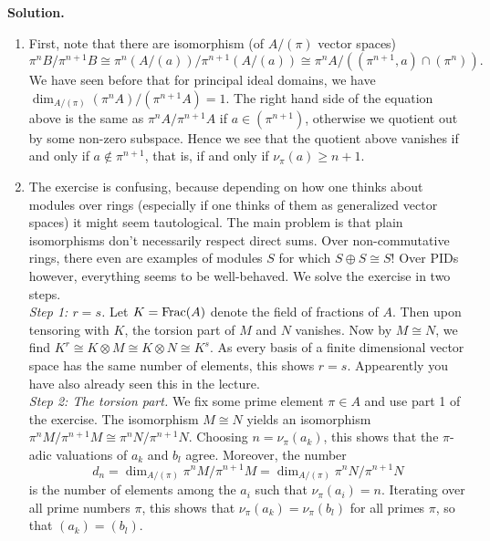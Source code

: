 \documentclass[a4paper,11pt]{article}
\begin{document}
\textbf{Solution.}
\begin{enumerate}
    \item First, note that there are isomorphism (of $A/(\pi)$ vector spaces)
        \begin{equation*}
            \pi^n B/\pi^{n+1}B \cong \pi^n \left(A / (a)\right) /
            \pi^{n+1}\left(A / (a)\right) \cong \pi^n A / ((\pi^{n+1}, a) \cap
            (\pi^n)).
        \end{equation*}
        We have seen before that for principal ideal domains, we have 
        $\dim_{A/(\pi)} (\pi^n A)/(\pi^{n+1}A) = 1$. The right hand side
        of the equation above is the same as $\pi^n A/\pi^{n+1}A$ if 
        $a \in (\pi^{n+1})$, otherwise we quotient out by some
        non-zero subspace. Hence we see that 
        the quotient above vanishes if and only if $a \not \in \pi^{n+1}$, that is,
        if and only if $\nu_\pi(a) \geq n+1$. 
    \item The exercise is confusing, because depending on how one thinks about 
        modules over rings (especially if one thinks of them as generalized
        vector spaces) it might seem tautological. The main problem is that
        plain isomorphisms don't necessarily respect direct sums. Over
        non-commutative rings, there even are examples of modules $S$ for which 
        $S\oplus S \cong S$! Over PIDs however, everything seems to be
        well-behaved. We solve the exercise in two steps.\\
        \textit{Step 1: $r=s$.} Let $K = \mathrm{Frac}(A)$ denote the field of
        fractions of $A$. Then
        upon tensoring with $K$, the torsion part of $M$ and $N$ vanishes.
        Now by $M \cong N$, we find $K^r \cong K \otimes M \cong K \otimes N \cong
        K^s$. As every basis of a finite dimensional vector space has the same
        number of elements, this shows $r = s$. Appearently you have also already
        seen this in the lecture. \\
        \textit{Step 2: The torsion part.} We fix some prime element $\pi \in A$ and 
        use part 1 of the exercise. The isomorphism $M \cong N$ yields an
        isomorphism $\pi^n M/\pi^{n+1}M \cong \pi^n N/\pi^{n+1}N$. 
        Choosing $n = \nu_\pi(a_k)$, this shows that the $\pi$-adic valuations
        of $a_k$ and $b_l$ agree. Moreover, the number 
        $$ d_n=\dim_{A/(\pi)} \pi^n M/\pi^{n+1}M = \dim_{A/(\pi)} \pi^n
           N/\pi^{n+1}N $$
        is the number of elements among the $a_i$ such that $\nu_\pi(a_i) = n$. 
        Iterating over all prime numbers $\pi$, this shows that $\nu_\pi(a_k) =
        \nu_\pi(b_l)$ for all primes $\pi$, so that $(a_k) = (b_l)$. 



\end{enumerate}

\contactend
\end{document}
